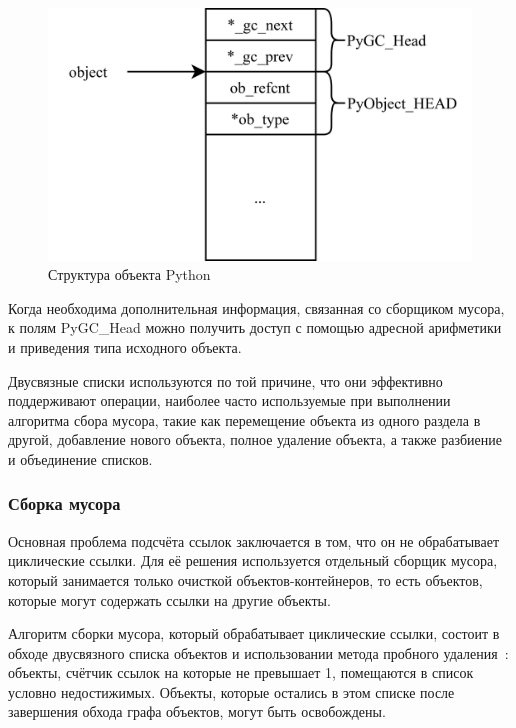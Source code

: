 \begin{figure}[H]
	\centering
	\includegraphics[scale=0.27]{assets/python-object.png}
	\caption{Структура объекта Python}
	\label{fig:pyobject}
\end{figure}

Когда необходима дополнительная информация, связанная со сборщиком мусора, к полям PyGC\_Head можно получить доступ с помощью адресной арифметики и приведения типа исходного объекта.~\cite{python_gc}

Двусвязные списки используются по той причине, что они эффективно поддерживают операции, наиболее часто используемые при выполнении алгоритма сбора мусора, такие как перемещение объекта из одного раздела в другой, добавление нового объекта, полное удаление объекта, а также разбиение и объединение списков.~\cite{python_gc}

\subsubsection{Сборка мусора}

Основная проблема подсчёта ссылок заключается в том, что он не обрабатывает циклические ссылки. Для её решения используется отдельный сборщик мусора, который занимается только очисткой объектов-контейнеров, то есть объектов, которые могут содержать ссылки на другие объекты.~\cite{python_gc}

Алгоритм сборки мусора, который обрабатывает циклические ссылки, состоит в обходе двусвязного списка объектов и использовании метода пробного удаления~\cite{handbook}: объекты, счётчик ссылок на которые не превышает 1, помещаются в список условно недостижимых. Объекты, которые остались в этом списке после завершения обхода графа объектов, могут быть освобождены.~\cite{python_gc}

